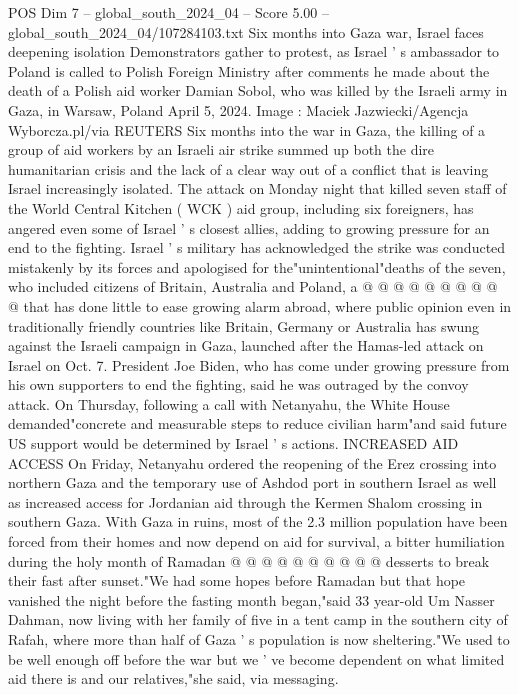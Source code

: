 \begin{textsample}{POS Dim 7 – global\_south\_2024\_04 – Score 5.00 – global\_south\_2024\_04/107284103.txt}  \label{ex:f7_pos_173}
Six months into Gaza war, Israel faces deepening isolation Demonstrators gather to protest, as Israel ' s ambassador to Poland is called to Polish Foreign Ministry after comments he made about the death of a Polish aid worker Damian Sobol, who was killed by the Israeli army in Gaza, in Warsaw, Poland April 5, 2024.
Image : Maciek Jazwiecki/Agencja Wyborcza.pl/via REUTERS Six months into the war in Gaza, the killing of a group of aid workers by an Israeli air strike summed up both the dire humanitarian crisis and the lack of a clear way out of a conflict that is leaving Israel increasingly isolated.
The attack on Monday night that killed seven staff of the World Central Kitchen ( WCK ) aid group, including six foreigners, has angered even some of Israel ' s closest allies, adding to growing pressure for an end to the fighting.
Israel ' s military has acknowledged the strike was conducted mistakenly by its forces and apologised for the"unintentional"deaths of the seven, who included citizens of Britain, Australia and Poland, a @ @ @ @ @ @ @ @ @ @ that has done little to ease growing alarm abroad, where public opinion even in traditionally friendly countries like Britain, Germany or Australia has swung against the Israeli campaign in Gaza, launched after the Hamas-led attack on Israel on Oct. 7.
President Joe Biden, who has come under growing pressure from his own supporters to end the fighting, said he was outraged by the convoy attack.
On Thursday, following a call with Netanyahu, the White House demanded"concrete and measurable steps to reduce civilian harm"and said future US support would be determined by Israel ' s actions.
INCREASED AID ACCESS On Friday, Netanyahu ordered the reopening of the Erez crossing into northern Gaza and the temporary use of Ashdod port in southern Israel as well as increased access for Jordanian aid through the Kermen Shalom crossing in southern Gaza.
With Gaza in ruins, most of the 2.3 million population have been forced from their homes and now depend on aid for survival, a bitter humiliation during the holy month of Ramadan @ @ @ @ @ @ @ @ @ @ desserts to break their fast after sunset."We had some hopes before Ramadan but that hope vanished the night before the fasting month began,"said 33 year-old Um Nasser Dahman, now living with her family of five in a tent camp in the southern city of Rafah, where more than half of Gaza ' s population is now sheltering."We used to be well enough off before the war but we ' ve become dependent on what limited aid there is and our relatives,"she said, via messaging.

\end{textsample}
